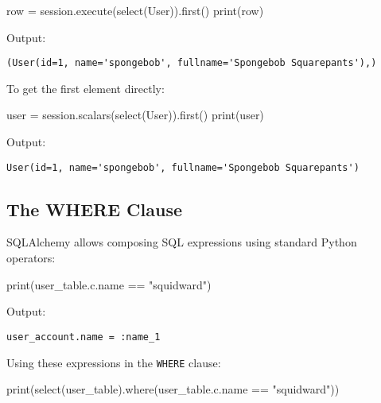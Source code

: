 \documentclass[
  letterpaper,
  DIV=11,
  numbers=noendperiod]{scrreprt}
\newenvironment{Shaded}{\begin{snugshade}}{\end{snugshade}}
\newcommand{\BuiltInTok}[1]{\textcolor[rgb]{0.00,0.23,0.31}{#1}}
\newcommand{\NormalTok}[1]{\textcolor[rgb]{0.00,0.23,0.31}{#1}}
\newcommand{\OperatorTok}[1]{\textcolor[rgb]{0.37,0.37,0.37}{#1}}
\newcommand{\StringTok}[1]{\textcolor[rgb]{0.13,0.47,0.30}{#1}}
\begin{document}
\begin{Shaded}
\begin{Highlighting}[]
\NormalTok{row }\OperatorTok{=}\NormalTok{ session.execute(select(User)).first()}
\BuiltInTok{print}\NormalTok{(row)}
\end{Highlighting}
\end{Shaded}

Output:

\begin{verbatim}
(User(id=1, name='spongebob', fullname='Spongebob Squarepants'),)
\end{verbatim}

To get the first element directly:

\begin{Shaded}
\begin{Highlighting}[]
\NormalTok{user }\OperatorTok{=}\NormalTok{ session.scalars(select(User)).first()}
\BuiltInTok{print}\NormalTok{(user)}
\end{Highlighting}
\end{Shaded}

Output:

\begin{verbatim}
User(id=1, name='spongebob', fullname='Spongebob Squarepants')
\end{verbatim}

\subsection{The WHERE Clause}\label{the-where-clause}

SQLAlchemy allows composing SQL expressions using standard Python
operators:

\begin{Shaded}
\begin{Highlighting}[]
\BuiltInTok{print}\NormalTok{(user\_table.c.name }\OperatorTok{==} \StringTok{"squidward"}\NormalTok{)}
\end{Highlighting}
\end{Shaded}

Output:

\begin{verbatim}
user_account.name = :name_1
\end{verbatim}

Using these expressions in the \texttt{WHERE} clause:

\begin{Shaded}
\begin{Highlighting}[]
\BuiltInTok{print}\NormalTok{(select(user\_table).where(user\_table.c.name }\OperatorTok{==} \StringTok{"squidward"}\NormalTok{))}
\end{Highlighting}
\end{Shaded}
\end{document}
